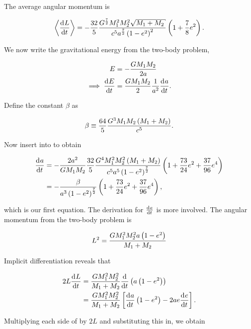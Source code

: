 The average angular momentum is

\begin{equation}
    \ev{\dv{L}{t}} = -\frac{32}{5}\frac{G^\frac72 M_1^2M_2^2\sqrt{M_1+M_2}}{c^5 a^\frac72 \pqty{1-e^2}^2}\pqty{1+\frac78 e^2}.
    \label{eq:average_ang_mom}
\end{equation}

We now write the gravitational energy from the two-body problem,

\begin{align}
    E &= -\frac{GM_1 M_2}{2a} \\
    \implies \dv{E}{t} &= \frac{GM_1 M_2}{2}\frac{1}{a^2}\dv{a}{t}.\label{eq:average_power_2body}
\end{align}

Define the constant $\beta$ as

\begin{equation}
    \beta \equiv \frac{64}{5}\frac{G^3M_1 M_2\left(M_1+M_2\right)}{c^5}.
\end{equation}

Now insert  into  to obtain

\begin{align}
    \dv{a}{t} &= -\frac{2a^2}{GM_1 M_2}\frac{32}{5}\frac{G^4M_1^2M_2^2\pqty{M_1+M_2}}{c^5a^5\pqty{1-e^2}^\frac72}\pqty{1+\frac{73}{24}e^2+\frac{37}{96}e^4} \\
    &= -\frac{\beta}{a^3\pqty{1-e^2}^\frac72}\pqty{1+\frac{73}{24}e^2+\frac{37}{96}e^4},
\end{align}

which is our first equation. The derivation for $\dv{e}{t}$ is more involved. The angular momentum from the two-body problem is

\begin{equation}
    L^2 = \frac{GM_1^2M_2^2a\left(1-e^2\right)}{M_1+M_2}
\end{equation}

Implicit differentiation reveals that

\begin{align}
    2L\dv{L}{t} &= \frac{GM_1^2M_2^2}{M_1+M_2}\dv{}{t} \pqty{a\pqty{1-e^2}} \\
    &= \frac{GM_1^2M_2^2}{M_1+M_2}\bqty{\dv{a}{t}\pqty{1-e^2}-2ae\dv{e}{t}}.
\end{align}

Multiplying each side of  by $2L$ and substituting this in, we obtain

